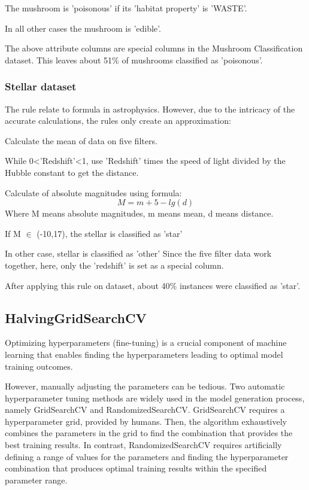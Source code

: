 \documentclass[runningheads,a4paper]{llncs}
\begin{document}
The mushroom is 'poisonous' if its 'habitat property' is 'WASTE'.

In all other cases the mushroom is 'edible'.

The above attribute columns are special columns in the Mushroom Classification dataset.
This leaves about 51\% of mushrooms classified as 'poisonous'.
\subsubsection{Stellar dataset}
The rule relate to formula in astrophysics\cite{ryden2020foundations}. However, due to the intricacy of the accurate calculations, the rules only create an approximation:


Calculate the mean of data on five filters.

While  0\textless'Redshift'\textless1, use 'Redshift' times the speed of light divided by the Hubble constant to get the distance.

Calculate of absolute magnitudes using formula:
\begin{equation}
M = m + 5 - lg(d)
\end{equation}
Where M means absolute magnitudes, m means mean, d means distance.

If M $\in$ (-10,17), the stellar is classified as 'star'

In other case, stellar is classified as 'other'
Since the five filter data work together, here, only the 'redshift' is set as a special column.

After applying this rule on dataset, about 40\% instances were classified as 'star'.
\subsection{HalvingGridSearchCV}
Optimizing hyperparameters (fine-tuning) is a crucial component of machine learning that enables finding the hyperparameters leading to optimal model training outcomes.

However, manually adjusting the parameters can be tedious.
Two automatic hyperparameter tuning methods are widely used in the model generation process, namely GridSearchCV and RandomizedSearchCV. GridSearchCV requires a hyperparameter grid, provided by humans. Then, the algorithm exhaustively combines the parameters in the grid to find the combination that provides the best training results.
In contrast, RandomizedSearchCV requires artificially defining a range of values for the parameters and finding the hyperparameter combination that produces optimal training results within the specified parameter range.
\end{document}
